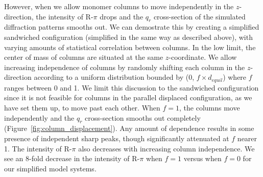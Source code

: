 \documentclass[journal=jpcbfk,manuscript=article]{achemso}
\begin{document}
  However, when we allow monomer columns to move independently in the
  $z$-direction, the intensity of R-$\pi$ drops and the $q_r$ cross-section of
  the simulated diffraction patterns smooths out. We can demostrate this by
  creating a simplified sandwiched configuration (simplified in the same way as
  described above), 
  with varying amounts of statistical correlation between columns. In the low
  limit, the center of mass of columns are situated at the same $z$-coordinate.
  We allow increasing independence of columns by randomly shifting each column in
  the $z$-direction according to a uniform distribution bounded by (0, $f \times
  \mathit{d}_{equil}$) where $f$ ranges between 0 and 1. We limit this discussion
  to the sandwiched configuration since it is not feasible for columns in the
  parallel displaced configuration, as we have set them up, to move past each
  other. When $f = 1$, the columns move independently and the $q_r$ cross-section
  smooths out completely (Figure~\ref{fig:column_displacement}). Any amount of
  dependence results in some presence of independent sharp peaks, though
  significantly attenuated at $f$ nearer 1. The intensity of R-$\pi$ also
  decreases with increasing column independence. We see an 8-fold decrease in the
  intensity of R-$\pi$ when $f=1$ versus when $f=0$ for our simplified model
  systems.
\end{document}
